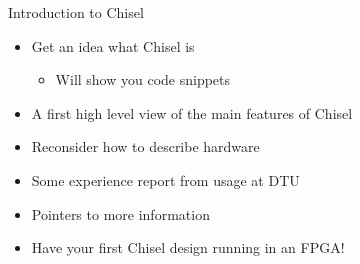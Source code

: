 \documentclass[xcolor=pdflatex,dvipsnames,table]{beamer}
\begin{document}
\begin{frame}[fragile]{Introduction to Chisel}
\begin{itemize}
\item Get an idea what Chisel is
\begin{itemize}
\item Will show you code snippets
\end{itemize}
\item A first high level view of the main features of Chisel
\item Reconsider how to describe hardware
\item Some experience report from usage at DTU
\item Pointers to more information
\item Have your first Chisel design running in an FPGA!
\end{itemize}
\end{frame}

%
%
%
%
\end{document}
